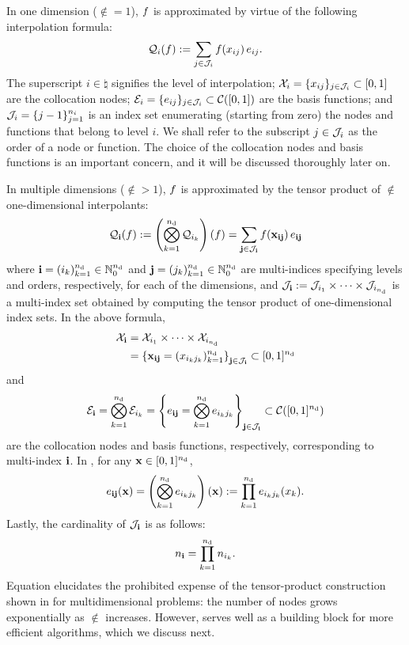 In one dimension ($\nin = 1$), $f$ is approximated by virtue of the following
interpolation formula:
\begin{equation} \elab{tensor-1d}
  \tensor{i}(\f) := \sum_{j \in \index_i} \f(\x_{ij}) \, \e_{ij}.
\end{equation}
The superscript $i \in \natural$ signifies the level of interpolation; $\mathcal{X}_i =
\{ x_{ij} \}_{j \in \mathcal{J}_i} \subset [0, 1]$ are the collocation nodes; $\mathcal{E}_i
= \{ e_{ij} \}_{j \in \mathcal{J}_i} \subset \mathcal{C}([0, 1])$ are the basis
functions; and $\mathcal{J}_i = \{ j - 1 \}_{j = 1}^{n_i}$ is an index set
enumerating (starting from zero) the nodes and functions that belong to level
$i$. We shall refer to the subscript $j \in \mathcal{J}_i$ as the order of a node or
function. The choice of the collocation nodes and basis functions is an
important concern, and it will be discussed thoroughly later on.

In multiple dimensions ($\nin > 1$), $f$ is approximated by the tensor product
of $\nin$ one-dimensional interpolants:
\begin{equation} \elab{tensor}
  \tensor{\vi}(\f) := \left( \bigotimes_{k = 1}^\nin \tensor{i_k} \right)(\f) = \sum_{\vj \in \index_\vi} \f(\vx_{\vi\vj}) \, \e_{\vi\vj}
\end{equation}
where $\mathbf{i} = (i_k)_{k = 1}^{n_\text{d}} \in \mathbb{N}_0^{n_\text{d}}$ and $\mathbf{j} = (j_k)_{k = 1}^{n_\text{d}}
\in \mathbb{N}_0^{n_\text{d}}$ are multi-indices specifying levels and orders, respectively,
for each of the dimensions, and $\mathcal{J}_{\mathbf{i}} := \mathcal{J}_{i_1} \times \cdots \times
\mathcal{J}_{i_{n_\text{d}}}$ is a multi-index set obtained by computing the tensor product
of one-dimensional index sets. In the above formula,
\begin{align}
  \X_\vi &= \X_{i_1} \times \cdots \times \X_{i_\nin} \elab{collocation-nodes} \\
         &= \left\{ \vx_{\vi\vj} = (\x_{i_k j_k})_{k = 1}^\nin \right\}_{\vj \in \index_\vi} \subset [0, 1]^\nin \nonumber
\end{align}
and
\begin{equation} \elab{basis-functions}
  \E_\vi = \bigotimes_{k = 1}^\nin \E_{i_k}
         = \left\{ \e_{\vi\vj} = \bigotimes_{k = 1}^\nin \e_{i_k j_k} \right\}_{\vj \in \index_\vi} \subset \continuous([0, 1]^\nin)
\end{equation}
are the collocation nodes and basis functions, respectively, corresponding to
multi-index $\mathbf{i}$. In , for any $\mathbf{x} \in [0, 1]^{n_\text{d}}$,
\[
  e_{\mathbf{i}\mathbf{j}}(\mathbf{x}) = \left( \bigotimes_{k = 1}^{n_\text{d}} e_{i_k j_k} \right)(\mathbf{x}) := \prod_{k = 1}^{n_\text{d}} e_{i_k j_k}(x_k).
\]
Lastly, the cardinality of $\mathcal{J}_{\mathbf{i}}$ is as follows:
\begin{equation} \elab{tensor-cardinality}
  \n_\vi = \prod_{k = 1}^\nin \n_{i_k}.
\end{equation}
Equation  elucidates the prohibited expense of the
tensor-product construction shown in  for multidimensional
problems: the number of nodes grows exponentially as $\nin$ increases. However,
 serves well as a building block for more efficient algorithms,
which we discuss next.

